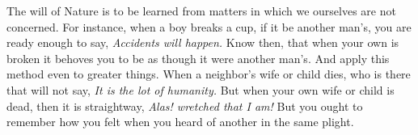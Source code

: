 The will of Nature is to be learned  from matters in which we ourselves are not
concerned. For instance, when  a boy breaks a cup, if it  be another man's, you
are ready  enough to say,  \emph{Accidents will  happen.} Know then,  that when
your own is  broken it behoves you to  be as though it were  another man's. And
apply this method even to greater things. When a neighbor's wife or child dies,
who is there that will not say, \emph{It is the lot of humanity.} But when your
own wife or child is dead, then  it is straightway, \emph{Alas! wretched that I
am!} But you  ought to remember how you  felt when you heard of  another in the
same plight.
